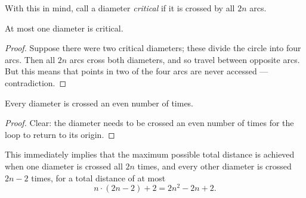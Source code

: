 With this in mind, call a diameter \emph{critical} if it is crossed by all $2n$ arcs.
\begin{claim*}
  At most one diameter is critical.
\end{claim*}
\begin{proof}
  Suppose there were two critical diameters; these divide the circle into four arcs.
  Then all $2n$ arcs cross both diameters, and so travel between opposite arcs.
  But this means that points in two of the four arcs are never accessed --- contradiction.
\end{proof}

\begin{claim*}
  Every diameter is crossed an even number of times.
\end{claim*}
\begin{proof}
  Clear: the diameter needs to be crossed an even number of times for the loop to return to its origin.
\end{proof}

This immediately implies that the maximum possible total distance
is achieved when one diameter is crossed all $2n$ times,
and every other diameter is crossed $2n-2$ times,
for a total distance of at most
\[ n \cdot (2n-2) + 2 = 2n^2 - 2n + 2. \]

